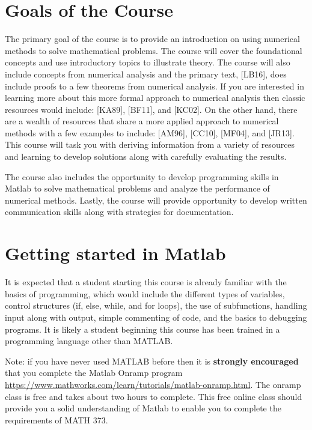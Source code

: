 \documentclass[twoside]{article}
\renewcommand{\cite}[1]{[#1]}
\begin{document}
\section{Goals of the Course}
The primary goal of the course is to provide an introduction on using numerical methods to solve mathematical problems. The course will cover the foundational concepts and use introductory topics to illustrate theory. The course will also include concepts from numerical analysis and the primary text, \cite{LB16}, does include proofs to a few theorems from  numerical analysis. If you are interested in learning more about this more formal approach to numerical analysis then classic resources would include: \cite{KA89}, \cite{BF11}, and \cite{KC02}. On the other hand, there are a wealth of resources that share a more applied approach to numerical methods with a few examples to include: \cite{AM96}, \cite{CC10}, \cite{MF04}, and \cite{JR13}. This course will task you with deriving information from a variety of resources and learning to develop solutions along with carefully evaluating the results. 


The course also includes the opportunity to develop programming skills in Matlab to solve mathematical problems and analyze the performance of numerical methods. Lastly, the course will provide opportunity to develop written communication skills along with strategies for documentation. 

\section{Getting started in Matlab}
It is expected that a student starting this course is already familiar with the basics of programming, which would include the different types of variables, control structures (if, else, while, and for loops), the use of subfunctions, handling input along with output, simple commenting of code, and the basics to debugging programs. It is likely a student beginning this course has been trained in a programming language other than MATLAB. 

Note: {\color{teal} if you have never used MATLAB before then it is {\bf strongly encouraged} that you complete the Matlab Onramp program \href{https://www.mathworks.com/learn/tutorials/matlab-onramp.html}{https://www.mathworks.com/learn/tutorials/matlab-onramp.html}. The onramp class is free and takes about two hours to complete. This free online class should provide you a solid understanding of Matlab to enable you to complete the requirements of MATH 373.}
\end{document}
